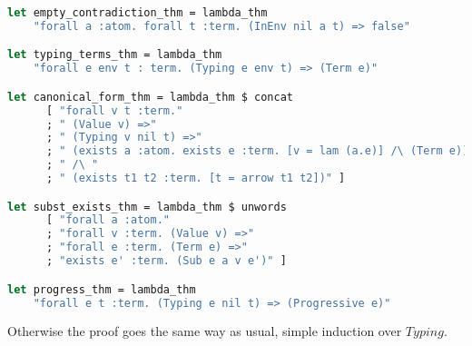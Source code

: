 \documentclass[english, mgr]{iithesis}
\begin{document}
\begin{lstlisting}[language=OCaml]
let empty_contradiction_thm = lambda_thm
    "forall a :atom. forall t :term. (InEnv nil a t) => false"

let typing_terms_thm = lambda_thm
    "forall e env t : term. (Typing e env t) => (Term e)"

let canonical_form_thm = lambda_thm $ concat
      [ "forall v t :term."
      ; " (Value v) =>"
      ; " (Typing v nil t) =>"
      ; " (exists a :atom. exists e :term. [v = lam (a.e)] /\ (Term e))"
      ; " /\ "
      ; " (exists t1 t2 :term. [t = arrow t1 t2])" ]

let subst_exists_thm = lambda_thm $ unwords
      [ "forall a :atom."
      ; "forall v :term. (Value v) =>"
      ; "forall e :term. (Term e) =>"
      ; "exists e' :term. (Sub e a v e')" ]

let progress_thm = lambda_thm
    "forall e t :term. (Typing e nil t) => (Progressive e)"
\end{lstlisting}
Otherwise the proof goes the same way as usual, simple induction over $Typing$.
\end{document}
